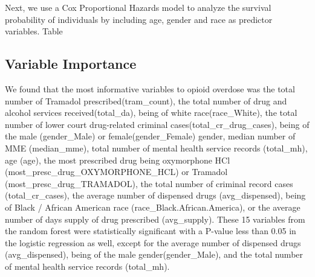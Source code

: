 \documentclass[twoside,10.5pt]{article}
\begin{document}
\begin{table}[h!]
  \begin{center}
    \caption{Probability of survival by Race}
    \label{tab:km_race}
  \end{center}
\end{table}

Next, we use a Cox Proportional Hazards model to analyze the survival probability of individuals by including age, gender and race as predictor variables. Table 

\subsection{Variable Importance}
We found that the most informative variables to opioid overdose was the total number of Tramadol prescribed(tram\_count), the total number of drug and alcohol services received(total\_da), being of white race(race\_White), the total number of lower court drug-related criminal cases(total\_cr\_drug\_cases), being of the male (gender\_Male) or female(gender\_Female) gender, median number of MME (median\_mme), total number of mental health service records (total\_mh), age (age), the most prescribed drug being oxymorphone HCl (most\_presc\_drug\_OXYMORPHONE\_HCL) or Tramadol (most\_presc\_drug\_TRAMADOL), the total number of criminal record cases (total\_cr\_cases), the average number of dispensed drugs (avg\_dispensed), being of Black / African American race (race\_Black.African.America), or the average number of days supply of drug prescribed (avg\_supply). 
These 15 variables from the random forest were statistically significant with a P-value less than 0.05 in the logistic regression as well, except for the average number of dispensed drugs (avg\_dispensed), being of the male gender(gender\_Male), and the total number of mental health service records (total\_mh).
\end{document}
